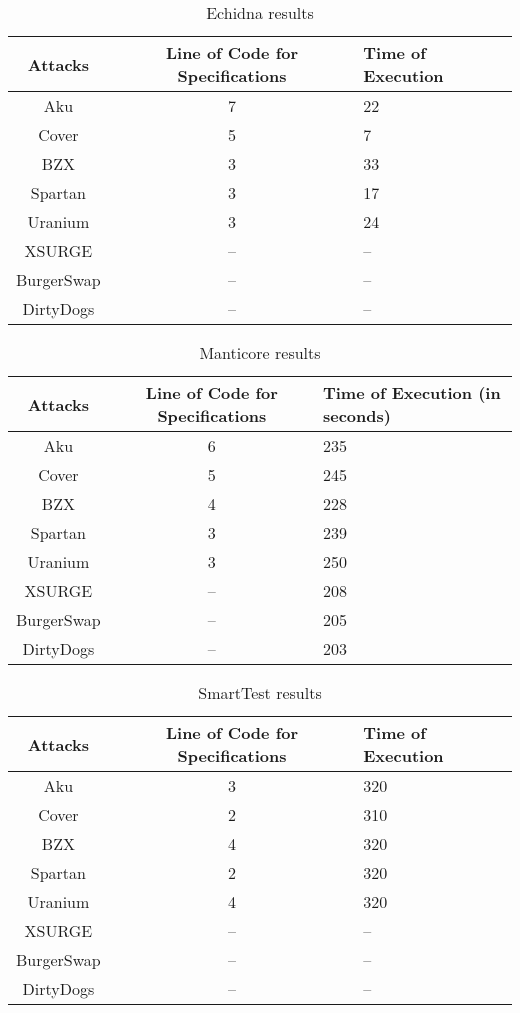 \begin{table*}    
    \caption{Echidna results}
    \label{tab:EchidnaTable}
    \begin{tabular}{ccl}
    \toprule
        Attacks & Line of Code for Specifications & Time of Execution\\
        \midrule
        Aku & 7 & 22 \\ 
        Cover & 5 & 7 \\ 
        BZX & 3 & 33  \\ 
        Spartan & 3 & 17   \\ 
        Uranium & 3 & 24 \\ 
        XSURGE & -- & -- \\  
        BurgerSwap &  -- & --\\ 
        DirtyDogs &  -- & -- \\
    \bottomrule
    \end{tabular}
\end{table*}

\begin{table*}
\caption{Manticore results}
    \label{tab:ManticoreTable}
    \begin{tabular}{ccl}
    \toprule
        Attacks & Line of Code for Specifications & Time of Execution (in seconds)\\
        \midrule
        Aku & 6 & 235  \\ 
        Cover & 5 & 245\\ 
        BZX  & 4 & 228\\ 
        Spartan & 3 & 239 \\ 
        Uranium  & 3 & 250\\ 
        XSURGE & -- & 208\\ 
        BurgerSwap  &  -- & 205 \\ 
        DirtyDogs & -- & 203 \\
    \bottomrule
    \end{tabular}
\end{table*}

\begin{table*}
\caption{SmartTest results}
    \label{tab:SmartTestTable}
    \begin{tabular}{ccl}
    \toprule
        Attacks & Line of Code for Specifications & Time of Execution\\
        \midrule
        Aku & 3 & 320 \\ 
        Cover & 2 & 310\\ 
        BZX  & 4& 320 \\ 
        Spartan &2 & 320\\ 
        Uranium  &4 & 320 \\ 
        XSURGE &  -- & -- \\  
        BurgerSwap &  -- & --\\ 
        DirtyDogs &  -- & -- \\
    \bottomrule
    \end{tabular}
\end{table*}


